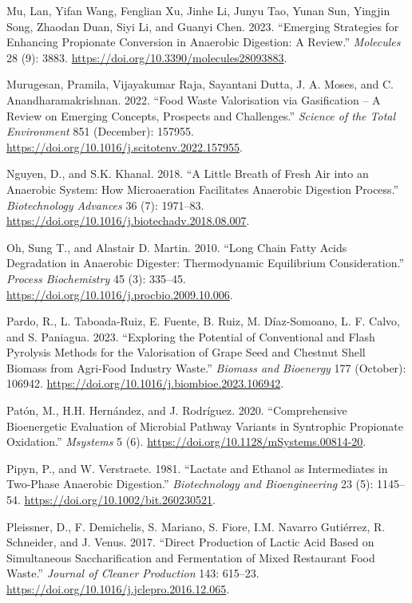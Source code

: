 \documentclass[11pt]{report}
\begin{document}
\begin{hangparas}{1.5em}{1}
\hypertarget{citeproc_bib_item_48}{Mu, Lan, Yifan Wang, Fenglian Xu, Jinhe Li, Junyu Tao, Yunan Sun, Yingjin Song, Zhaodan Duan, Siyi Li, and Guanyi Chen. 2023. “Emerging Strategies for Enhancing Propionate Conversion in Anaerobic Digestion: A Review.” \textit{Molecules} 28 (9): 3883. \url{https://doi.org/10.3390/molecules28093883}.}

\hypertarget{citeproc_bib_item_49}{Murugesan, Pramila, Vijayakumar Raja, Sayantani Dutta, J. A. Moses, and C. Anandharamakrishnan. 2022. “Food Waste Valorisation via Gasification – A Review on Emerging Concepts, Prospects and Challenges.” \textit{Science of the Total Environment} 851 (December): 157955. \url{https://doi.org/10.1016/j.scitotenv.2022.157955}.}

\hypertarget{citeproc_bib_item_50}{Nguyen, D., and S.K. Khanal. 2018. “A Little Breath of Fresh Air into an Anaerobic System: How Microaeration Facilitates Anaerobic Digestion Process.” \textit{Biotechnology Advances} 36 (7): 1971–83. \url{https://doi.org/10.1016/j.biotechadv.2018.08.007}.}

\hypertarget{citeproc_bib_item_51}{Oh, Sung T., and Alastair D. Martin. 2010. “Long Chain Fatty Acids Degradation in Anaerobic Digester: Thermodynamic Equilibrium Consideration.” \textit{Process Biochemistry} 45 (3): 335–45. \url{https://doi.org/10.1016/j.procbio.2009.10.006}.}

\hypertarget{citeproc_bib_item_52}{Pardo, R., L. Taboada-Ruiz, E. Fuente, B. Ruiz, M. Díaz-Somoano, L. F. Calvo, and S. Paniagua. 2023. “Exploring the Potential of Conventional and Flash Pyrolysis Methods for the Valorisation of Grape Seed and Chestnut Shell Biomass from Agri-Food Industry Waste.” \textit{Biomass and Bioenergy} 177 (October): 106942. \url{https://doi.org/10.1016/j.biombioe.2023.106942}.}

\hypertarget{citeproc_bib_item_53}{Patón, M., H.H. Hernández, and J. Rodríguez. 2020. “Comprehensive Bioenergetic Evaluation of Microbial Pathway Variants in Syntrophic Propionate Oxidation.” \textit{Msystems} 5 (6). \url{https://doi.org/10.1128/mSystems.00814-20}.}

\hypertarget{citeproc_bib_item_54}{Pipyn, P., and W. Verstraete. 1981. “Lactate and Ethanol as Intermediates in Two-Phase Anaerobic Digestion.” \textit{Biotechnology and Bioengineering} 23 (5): 1145–54. \url{https://doi.org/10.1002/bit.260230521}.}

\hypertarget{citeproc_bib_item_55}{Pleissner, D., F. Demichelis, S. Mariano, S. Fiore, I.M. Navarro Gutiérrez, R. Schneider, and J. Venus. 2017. “Direct Production of Lactic Acid Based on Simultaneous Saccharification and Fermentation of Mixed Restaurant Food Waste.” \textit{Journal of Cleaner Production} 143: 615–23. \url{https://doi.org/10.1016/j.jclepro.2016.12.065}.}


\end{hangparas}
\end{document}
